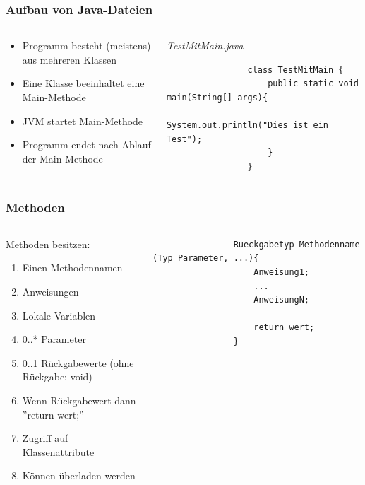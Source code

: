 \begin{frame}[fragile]
	\frametitle{Aufbau von Java-Dateien}
	\begin{columns}
		\begin{column}{0.5\textwidth}
			\small
			\begin{itemize}
			  \item Programm besteht (meistens) aus mehreren Klassen
			  \item Eine Klasse beeinhaltet eine Main-Methode
			  \item JVM startet Main-Methode
			  \item Programm endet nach Ablauf der Main-Methode
			\end{itemize}
			\normalsize
		\end{column}
		\begin{column}{0.5\textwidth}{\tiny \itshape TestMitMain.java}
			\begin{lstlisting}
				class TestMitMain {
					public static void main(String[] args){
						System.out.println("Dies ist ein Test");
					}
				}
			\end{lstlisting}
		\end{column}
	\end{columns}
\end{frame}

\begin{frame}[fragile]
	  \frametitle{Methoden}
		 \begin{columns}
		 \begin{column}{0.5\textwidth}
			  \small
			  Methoden besitzen:
			  \begin{enumerate}
			  	\item Einen Methodennamen
			  	\item Anweisungen
			  	\item Lokale Variablen
			  	\item 0..* Parameter
			  	\item 0..1 R\"uckgabewerte (ohne R\"uckgabe: void)
			  	\item Wenn R\"uckgabewert dann ''return wert;''
			  	\item Zugriff auf Klassenattribute
			  	\item K\"onnen \"uberladen werden
			  \end{enumerate}
		 \end{column}
		 \begin{column}{0.5\textwidth}
		 	\begin{lstlisting}
		 		Rueckgabetyp Methodenname (Typ Parameter, ...){
		 			Anweisung1;
		 			...
		 			AnweisungN;
		 			
		 			return wert;
		 		}
		 	\end{lstlisting}
		 \end{column}
		 \end{columns}
\end{frame}


